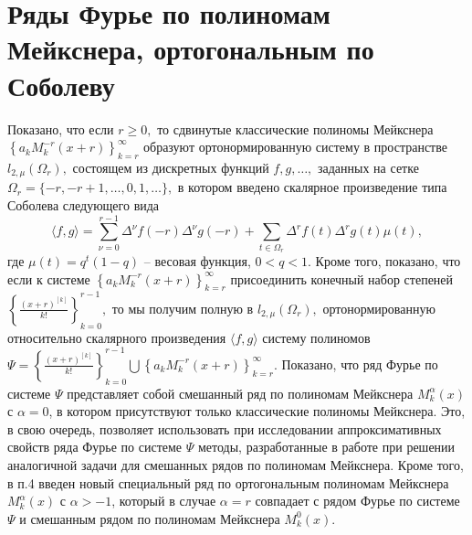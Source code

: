 \section{Ряды Фурье по полиномам Мейкснера, ортогональным по Соболеву}
Показано, что если $r\geq 0,$  то сдвинутые классические полиномы Мейкснера \linebreak $\left\{a_kM_k^{-r}(x+r)\right\}_{k=r}^\infty$ образуют ортонормированную систему в пространстве $l_{2,\mu}(\Omega_r),$  состоящем из дискретных функций $f,g, \ldots,$  заданных на сетке $\Omega_r=\{-r, -r+1, \ldots, 0, 1, \ldots\},$  в котором введено  скалярное произведение типа Соболева следующего вида
$$
\langle f,g \rangle=\sum_{\nu=0}^{r-1}\Delta^{\nu} f(-r)\Delta^{\nu} g(-r) + \sum_{t\in\Omega_r}\Delta^r f(t) \Delta^r g(t)\mu(t),
$$
где  $\mu(t)=q^t(1-q)$ -- весовая функция, $0<q<1.$  Кроме того, показано, что если к системе $\left\{a_kM_k^{-r}(x+r)\right\}_{k=r}^\infty$  присоединить конечный набор степеней $\left\{\frac{(x+r)^{[k]}}{k!}\right\}_{k=0}^{r-1},$ то мы получим полную в $l_{2,\mu}(\Omega_r),$  ортонормированную относительно скалярного произведения $\langle f,g \rangle$ систему полиномов $\Psi=\left\{\frac{(x+r)^{[k]}}{k!}\right\}_{k=0}^{r-1}\bigcup\left\{a_kM_k^{-r}(x+r)\right\}_{k=r}^\infty.$
Показано, что ряд Фурье по системе  $\Psi$ представляет собой смешанный ряд по полиномам Мейкснера $M_k^\alpha(x)$ с $\alpha=0$, в котором присутствуют только классические полиномы Мейкснера. Это, в свою очередь, позволяет использовать при исследовании аппроксимативных свойств ряда Фурье по системе $\Psi$  методы, разработанные в работе \cite{Haar-Tcheb-Shar13} при решении аналогичной задачи для смешанных рядов по полиномам Мейкснера. Кроме того, в п.4 введен новый специальный ряд по ортогональным полиномам Мейкснера $M_k^{\alpha}(x)$ с $\alpha>-1$, который в случае $\alpha=r$  совпадает с рядом Фурье по системе $\Psi$  и смешанным рядом по полиномам Мейкснера $M_k^0(x)$.


%
%


